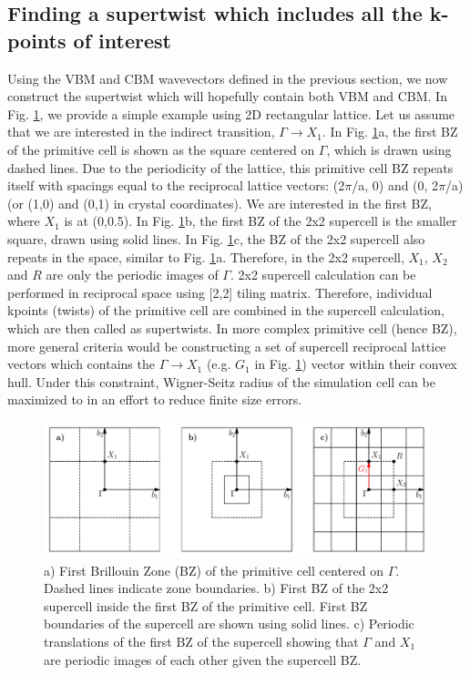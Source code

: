 \subsection{Finding a supertwist which includes all the k-points of interest}
Using the VBM and CBM wavevectors defined in the previous section, we now construct the supertwist which will hopefully contain both VBM and CBM. In Fig. \ref{fig:lab_ex_twists}, we provide a simple example using 2D rectangular lattice. 
Let us assume that we are interested in the indirect transition, $\Gamma \rightarrow X_1$. 
In Fig. \ref{fig:lab_ex_twists}a, the first BZ of the primitive cell is shown as the square centered on $\Gamma$, which is drawn using dashed lines. Due to the periodicity of the lattice, this primitive cell BZ repeats itself with spacings equal to the reciprocal lattice vectors: (2$\pi$/a, 0) and (0, 2$\pi$/a) (or (1,0) and (0,1) in crystal coordinates). 
We are interested in the  first BZ, where $X_1$ is at (0,0.5). 
In Fig. \ref{fig:lab_ex_twists}b, the first BZ of the 2x2 supercell is the smaller square, drawn using solid lines. 
In Fig. \ref{fig:lab_ex_twists}c, the BZ of the 2x2 supercell also repeats in the space, similar to Fig. \ref{fig:lab_ex_twists}a. 
Therefore, in the 2x2 supercell, $X_1$, $X_2$ and $R$ are only the periodic images of $\Gamma$.  2x2 supercell calculation can be performed in reciprocal space using [2,2] tiling matrix. 
Therefore, individual kpoints (twists) of the primitive cell are combined in the supercell calculation, which are then called as supertwists. 
In more complex primitive cell (hence BZ), more general criteria would be constructing a set of supercell reciprocal lattice vectors which contains the $\Gamma \rightarrow X_1$ (e.g. $G_1$ in Fig. \ref{fig:lab_ex_twists}) vector within their convex hull. 
Under this constraint, Wigner-Seitz radius of the simulation cell can be maximized to in an effort to reduce finite size errors. 

\begin{figure}
	\includegraphics[width=\textwidth]{figures/lab_excited_twists}
	\caption{a) First Brillouin Zone (BZ) of the primitive cell centered on $\Gamma$. Dashed lines indicate zone boundaries. b) First BZ of the 2x2 supercell inside the first BZ of the primitive cell. First BZ boundaries of the supercell are shown using solid lines. c) Periodic translations of the first BZ of the supercell showing that $\Gamma$ and $X_1$ are periodic images of each other given the supercell BZ. }
	\label{fig:lab_ex_twists}
\end{figure}

